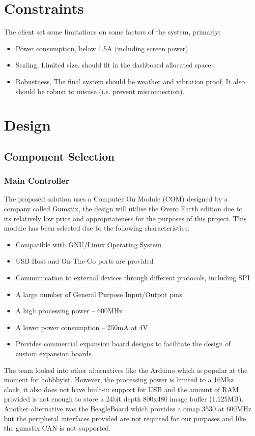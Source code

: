 \documentclass[11pt,a4wide]{article}
\begin{document}
\section{Constraints}
The client set some limitations on some factors of the system, primarly:
\begin{itemize}
	\item Power consumption, below 1.5A (including screen power)
	\item Scaling, Limited size, should fit in the dashboard allocated space.
	\item Robustness, The final system should be weather and vibration proof. It also should be robust to misuse (i.e. prevent misconnection).
\end{itemize}

\section{Design}
\subsection{Component Selection}
\subsubsection{Main Controller}
The proposed solution uses a Computer On Module (COM) designed by a company called Gumstix, the design will utilise the Overo Earth edition due to its relatively low price and appropriateness for the purposes of this project.
This module has been selected due to the following characteristics:
\begin{itemize}
	\item Compatible with GNU/Linux Operating System
	\item USB Host and On-The-Go ports are provided
	\item Communication to external devices through different protocols, including SPI
	\item A large number of General Purpose Input/Output pins
	\item A high processing power -- 600MHz
	\item A lower power consumption -- 250mA at 4V
	\item Provides commercial expansion board designs to facilitate the design of custom expansion boards.
\end{itemize}
The team looked into other alternatives like the Arduino which is popular at the moment for hobbbyist. However, the processing power is limited to a 16Mhz clock, it also does not have built-in support for USB and the amount of RAM provided is not enough to store a 24bit depth 800x480 image buffer (1.125MB). Another alternative was the BeagleBoard which provides a omap 3530 at 600MHz but the peripheral interfaces provided are not required for our purposes and like the gumstix CAN is not supported.
\end{document}
